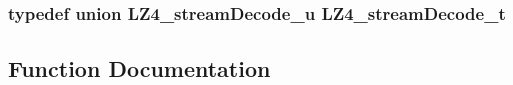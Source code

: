 \subsubsection[{L\+Z4\+\_\+stream\+Decode\+\_\+t}]{\setlength{\rightskip}{0pt plus 5cm}typedef union {\bf L\+Z4\+\_\+stream\+Decode\+\_\+u} {\bf L\+Z4\+\_\+stream\+Decode\+\_\+t}}\label{compat-lz4_8h_a76a1eaa4729efddb43040217daad4d4e}


\subsection{Function Documentation}
\hypertarget{compat-lz4_8h_a7a99ebb0d007cb52765821274a7a5179}{}
